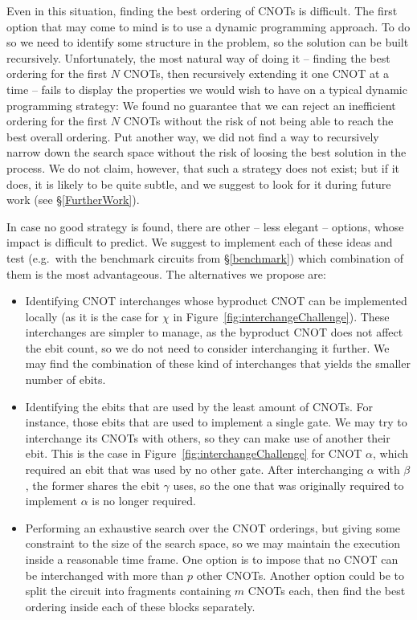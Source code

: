 Even in this situation, finding the best ordering of CNOTs is difficult. The first option that may come to mind is to use a dynamic programming approach. To do so we need to identify some structure in the problem, so the solution can be built recursively. Unfortunately, the most natural way of doing it -- finding the best ordering for the first \(N\) CNOTs, then recursively extending it one CNOT at a time -- fails to display the properties we would wish to have on a typical dynamic programming strategy: We found no guarantee that we can reject an inefficient ordering for the first \(N\) CNOTs without the risk of not being able to reach the best overall ordering. Put another way, we did not find a way to recursively narrow down the search space without the risk of loosing the best solution in the process. We do not claim, however, that such a strategy does not exist; but if it does, it is likely to be quite subtle, and we suggest to look for it during future work (see \S\ref{FurtherWork}).

In case no good strategy is found, there are other -- less elegant -- options, whose impact is difficult to predict. We suggest to implement each of these ideas and test (e.g.\ with the benchmark circuits from \S\ref{benchmark}) which combination of them is the most advantageous. The alternatives we propose are:

\begin{itemize}

\item Identifying CNOT interchanges whose byproduct CNOT can be implemented locally (as it is the case for \(\chi\) in Figure~\ref{fig:interchangeChallenge}). These interchanges are simpler to manage, as the byproduct CNOT does not affect the ebit count, so we do not need to consider interchanging it further. We may find the combination of these kind of interchanges that yields the smaller number of ebits.

\item Identifying the ebits that are used by the least amount of CNOTs. For instance, those ebits that are used to implement a single gate. We may try to interchange its CNOTs with others, so they can make use of another their ebit. This is the case in Figure~\ref{fig:interchangeChallenge} for CNOT \(\alpha\), which required an ebit that was used by no other gate. After interchanging \(\alpha\) with \(\beta\), the former shares the ebit \(\gamma\) uses, so the one that was originally required to implement \(\alpha\) is no longer required.

\item Performing an exhaustive search over the CNOT orderings, but giving some constraint to the size of the search space, so we may maintain the execution inside a reasonable time frame. One option is to impose that no CNOT can be interchanged with more than \(p\) other CNOTs. Another option could be to split the circuit into fragments containing \(m\) CNOTs each, then find the best ordering inside each of these blocks separately.

\end{itemize}
